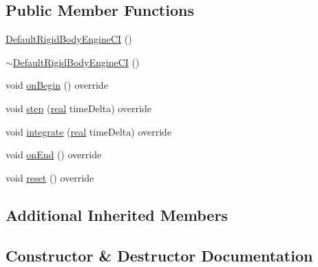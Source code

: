\subsection*{Public Member Functions}
\begin{DoxyCompactItemize}
\item 
\mbox{\hyperlink{classrum_1_1_default_rigid_body_engine_c_i_a693b159c324d9ee2c7e00f2a4b686889}{Default\+Rigid\+Body\+Engine\+CI}} ()
\item 
\mbox{\hyperlink{classrum_1_1_default_rigid_body_engine_c_i_af8c182c149f22940599bbfce7d381ebe}{$\sim$\+Default\+Rigid\+Body\+Engine\+CI}} ()
\item 
void \mbox{\hyperlink{classrum_1_1_default_rigid_body_engine_c_i_a8babbc59b2094399ef2048bbe505332d}{on\+Begin}} () override
\item 
void \mbox{\hyperlink{classrum_1_1_default_rigid_body_engine_c_i_ae8b25ed02fc8fecc4d606d5c5dad6b4e}{step}} (\mbox{\hyperlink{namespacerum_a7e8cca23573d5eaead0f138cbaa4862c}{real}} time\+Delta) override
\item 
void \mbox{\hyperlink{classrum_1_1_default_rigid_body_engine_c_i_a881930b7e9637aa228a875fd9e376a5a}{integrate}} (\mbox{\hyperlink{namespacerum_a7e8cca23573d5eaead0f138cbaa4862c}{real}} time\+Delta) override
\item 
void \mbox{\hyperlink{classrum_1_1_default_rigid_body_engine_c_i_aa1bc991031aab98d598f69c61fd3bc4c}{on\+End}} () override
\item 
void \mbox{\hyperlink{classrum_1_1_default_rigid_body_engine_c_i_aedfdb21689b6921afec2b9c607377335}{reset}} () override
\end{DoxyCompactItemize}
\subsection*{Additional Inherited Members}


\subsection{Constructor \& Destructor Documentation}
\mbox{\label{classrum_1_1_default_rigid_body_engine_c_i_a693b159c324d9ee2c7e00f2a4b686889}} 
